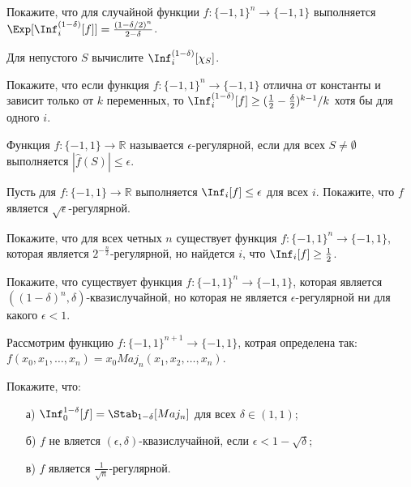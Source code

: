 \begin{task}
    Покажите, что для случайной функции $f: \{-1, 1\}^n \to \{-1, 1\}$ выполняется $\Exp[\Inf_i^{(1 - \delta)}[f]] =
    \frac{(1 - \delta / 2)^n}{2 - \delta}$.
\end{task}

\begin{task}
    Для непустого $S$ вычислите $\Inf_i^{(1 - \delta)}[\chi_S]$.
\end{task}


\begin{task}
    Покажите, что если функция $f:\{-1, 1\}^n \to \{-1, 1\}$ отлична от константы и зависит только от $k$ переменных, то
    $\Inf_i^{(1 - \delta)}[f] \ge (\frac{1}{2} - \frac{\delta}{2})^{k - 1} / k$ хотя бы для одного $i$.
\end{task}


Функция $f: \{-1, 1\} \to \mathbb{R}$ называется $\epsilon$-регулярной, если для всех $S \neq \emptyset$ выполняется $|\hat f(S)|
\le \epsilon$.

\begin{task}
    Пусть для $f: \{-1, 1\} \to \mathbb{R}$ выполняется $\Inf_i[f] \le \epsilon$ для всех $i$. Покажите, что $f$ является
    $\sqrt{\epsilon}$-регулярной.
\end{task}


\begin{task}
    Покажите, что для всех четных $n$ существует функция $f: \{-1, 1\}^n \to \{-1, 1\}$, которая является
    $2^{-\frac{n}{2}}$-регулярной, но найдется $i$, что $\Inf_i[f] \ge \frac{1}{2}$.
\end{task}

\begin{task}
	Покажите, что существует функция $f: \{-1, 1\}^n \to \{-1, 1\}$, которая является $((1 - \delta)^n, \delta)$-квазислучайной,
    но которая не является $\epsilon$-регулярной ни для какого $\epsilon < 1$.
\end{task}


\begin{task}
    Рассмотрим функцию $f: \{-1, 1\}^{n + 1} \to \{-1, 1\}$, котрая определена так: $f(x_0, x_1, \dots, x_n) = x_0 Maj_n(x_1, x_2,
    \dots, x_n)$.

    Покажите, что:
    \begin{enumerate}[topsep = 0pt, itemsep = -1ex]
        \item [а)]  $\Inf_0^{1-\delta}[f]=\Stab_{1-\delta}[Maj_n]$ для всех $\delta\in (1,1)$;
        \item [б)] $f$ не вляется $(\epsilon, \delta)$-квазислучайной, если $\epsilon<1-\sqrt{\delta}$;
		\item [в)] $f$ является $\frac{1}{\sqrt{n}}$-регулярной.
	\end{enumerate}
\end{task}


